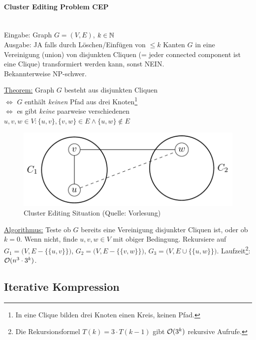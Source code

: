 \paragraph{Cluster Editing Problem CEP} \mbox{} \\
Eingabe: Graph $G = (V, E)$, $k \in \mathbb{N}$ \\
Ausgabe: JA falls durch Löschen/Einfügen von $\leq k$ Kanten $G$ in eine Vereinigung (union) von disjunkten Cliquen
(= jeder connected component ist eine Clique) transformiert werden kann, sonst NEIN. \\
Bekannterweise NP-schwer.

\underline{Theorem:}
Graph $G$ besteht aus disjunkten Cliquen \\
$\iff$ $G$ enthält \emph{keinen} Pfad aus drei Knoten\footnote{In eine Clique bilden drei Knoten einen Kreis, keinen Pfad.}\\
$\iff$ es gibt \emph{keine} paarweise verschiedenen $u, v, w \in V : \{u,v\}, \{v,w\} \in E \wedge \{u,w\} \notin E$

\begin{figure}[h]
    \centering
    \includegraphics[scale=0.35]{images/cluster-editing.png}
    \caption{Cluster Editing Situation (Quelle: Vorlesung)}
    \label{fig:cluster-editing}
\end{figure}

\underline{Algorithmus:}
Teste ob $G$ bereits eine Vereinigung disjunkter Cliquen ist, oder ob $k=0$.
Wenn nicht, finde $u,v,w \in V$ mit obiger Bedingung.
Rekursiere auf
$G_1 = \big(V, E   -  \{ \{u,v\} \} \big)$,
$G_2 = \big(V, E   -  \{ \{v,w\} \} \big)$,
$G_3 = \big(V, E \cup \{ \{u,w\} \} \big)$.
Laufzeit\footnote{Die Rekursionsformel $T(k) = 3 \cdot T(k-1)$ gibt $\mathcal{O} (3^k)$ rekursive Aufrufe.}:
$\mathcal{O} (n^3 \cdot 3^k)$.


\subsection{Iterative Kompression}


